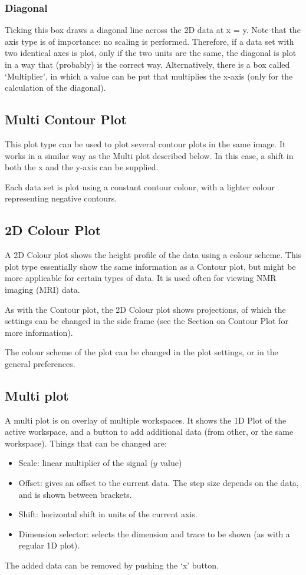 \documentclass[11pt,a4paper]{article}
\begin{document}
\subsubsection*{Diagonal}
Ticking this box draws a diagonal line across the 2D data at x = y. Note that the axis type is of importance: no scaling is performed.
Therefore, if a data set with two identical axes is plot, only if the two units are the same, the diagonal is plot in a way that (probably) is the correct way.
Alternatively, there is a box called `Multiplier', in which a value can be put that multiplies the x-axis (only for the calculation of the diagonal).

\subsection{Multi Contour Plot}
This plot type can be used to plot several contour plots in the same image. It works in a similar way as the Multi plot described below. In this case, a shift in both the x and the y-axis can be supplied.

Each data set is plot using a constant contour colour, with a lighter colour representing negative contours.

\subsection{2D Colour Plot}
A 2D Colour plot shows the height profile of the data using a colour scheme.
This plot type essentially show the same information as a Contour plot, but might
be more applicable for certain types of data. It is used often for viewing NMR imaging (MRI) data.

As with the Contour plot, the 2D Colour plot shows projections, of which the settings can be changed in the side frame (see the Section on Contour Plot for more information).

The colour scheme of the plot can be changed in the plot settings, or in the general preferences.

\subsection{Multi plot}
A multi plot is on overlay of multiple workspaces. It shows the 1D Plot of the active workspace, and a button
to add additional data (from other, or the same workspace). Things that can be changed are:
\begin{itemize}
  \item Scale: linear multiplier of the signal ($y$ value)
  \item Offset: gives an offset to the current data. The step size depends on the data, and is shown between
	 brackets.
  \item Shift: horizontal shift in units of the current axis.
  \item Dimension selector: selects the dimension and trace to be shown (as with a regular 1D plot).
\end{itemize}
The added data can be removed by pushing the `x' button.
\end{document}
